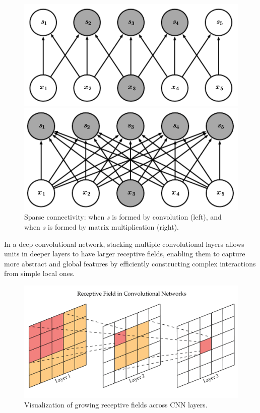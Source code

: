 \begin{figure}[H]
    \centering
    \begin{minipage}{0.45\textwidth}
        \centering
        \includegraphics[width=\linewidth]{Images/Chapters/sparsity_1.png}
    \end{minipage}
    \hfill
    \begin{minipage}{0.45\textwidth}
        \centering
        \includegraphics[width=\linewidth]{Images/Chapters/sparsity_2.png}
    \end{minipage}
    \caption{Sparse connectivity: when \textit{s} is formed by convolution (left), and when \textit{s} is formed by matrix multiplication (right).}
    \label{fig:sparsity}
\end{figure}



In a deep convolutional network, stacking multiple convolutional layers allows units in deeper layers to have larger receptive fields, enabling them to capture more abstract and global features by efficiently constructing complex interactions from simple local ones.

\begin{figure}[H]
    \centering
    \includegraphics[width=0.5\linewidth]{Images/Chapters/receptive_fields.png}
    \caption{Visualization of growing receptive fields across CNN layers.}
    \label{fig:receptive_fields}
\end{figure}

